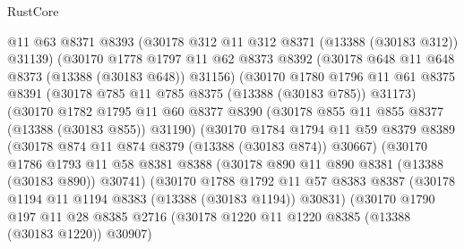 \begin{lexlean}{RustCore}
\begin{coremodule}
                        @11
                        @63
                        @8371
                        @8393
                        (@30178 @312 @11 @312 @8371 (@13388 (@30183 @312)) @31139)
                        (@30170
                          @1778
                          @1797
                          @11
                          @62
                          @8373
                          @8392
                          (@30178 @648 @11 @648 @8373 (@13388 (@30183 @648)) @31156)
                          (@30170
                            @1780
                            @1796
                            @11
                            @61
                            @8375
                            @8391
                            (@30178 @785 @11 @785 @8375 (@13388 (@30183 @785)) @31173)
                            (@30170
                              @1782
                              @1795
                              @11
                              @60
                              @8377
                              @8390
                              (@30178 @855 @11 @855 @8377 (@13388 (@30183 @855)) @31190)
                              (@30170
                                @1784
                                @1794
                                @11
                                @59
                                @8379
                                @8389
                                (@30178 @874 @11 @874 @8379 (@13388 (@30183 @874)) @30667)
                                (@30170
                                  @1786
                                  @1793
                                  @11
                                  @58
                                  @8381
                                  @8388
                                  (@30178 @890 @11 @890 @8381 (@13388 (@30183 @890)) @30741)
                                  (@30170
                                    @1788
                                    @1792
                                    @11
                                    @57
                                    @8383
                                    @8387
                                    (@30178 @1194 @11 @1194 @8383 (@13388 (@30183 @1194)) @30831)
                                    (@30170
                                      @1790
                                      @197
                                      @11
                                      @28
                                      @8385
                                      @2716
                                      (@30178 @1220 @11 @1220 @8385 (@13388 (@30183 @1220)) @30907)

\end{coremodule}
\end{lexlean}

